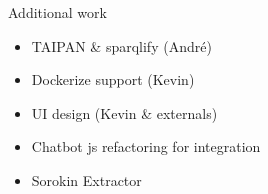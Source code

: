\begin{frame}{Additional work}
	\begin{itemize}
		\item TAIPAN \& sparqlify (André)
		\item Dockerize support (Kevin)
		\item UI design (Kevin \& externals)
		\item Chatbot js refactoring for integration
		\item Sorokin Extractor
	\end{itemize}
\end{frame}